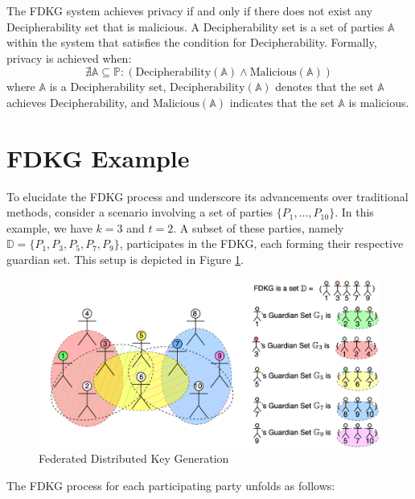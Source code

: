 \documentclass[runningheads]{llncs}
\begin{document}
\begin{definition}[Privacy] \label{def:privacy}
    The FDKG system achieves privacy if and only if there does not exist any Decipherability set that is malicious. A Decipherability set is a set of parties \( \mathbb{A} \) within the system that satisfies the condition for Decipherability. Formally, privacy is achieved when:
    \[
    \nexists \mathbb{A} \subseteq \mathbb{P} : (\text{Decipherability}(\mathbb{A}) \land \text{Malicious}(\mathbb{A}))
    \]
    where \( \mathbb{A} \) is a Decipherability set, \( \text{Decipherability}(\mathbb{A}) \) denotes that the set \( \mathbb{A} \) achieves Decipherability, and \( \text{Malicious}(\mathbb{A}) \) indicates that the set \( \mathbb{A} \) is malicious.
\end{definition}


\section{FDKG Example}

To elucidate the FDKG process and underscore its advancements over traditional methods, consider a scenario involving a set of parties $\{P_1, \ldots, P_{10}\}$. In this example, we have $k = 3$ and $t = 2$. A subset of these parties, namely $\mathbb{D} = \{P_1, P_3, P_5, P_7, P_9\}$, participates in the FDKG, each forming their respective guardian set. This setup is depicted in Figure \ref{fig:FDKG}.

\begin{figure}
    \centering
    \includegraphics[width=\textwidth]{FDKG.png}
    \caption{Federated Distributed Key Generation}
    \label{fig:FDKG}
\end{figure}

The FDKG process for each participating party unfolds as follows:
\end{document}
